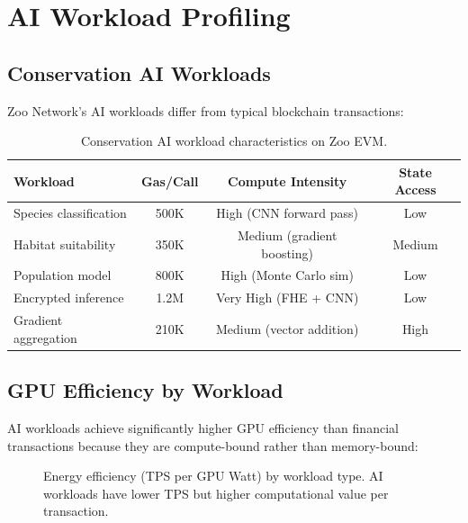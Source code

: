 \section{AI Workload Profiling}

\label{sec:ai-workloads}

\subsection{Conservation AI Workloads}

Zoo Network's AI workloads differ from typical blockchain transactions:

\begin{table}[t]
\centering
\begin{tabular}{lccc}
\toprule
\textbf{Workload} & \textbf{Gas/Call} & \textbf{Compute Intensity} & \textbf{State Access} \\
\midrule
Species classification & 500K & High (CNN forward pass) & Low \\
Habitat suitability & 350K & Medium (gradient boosting) & Medium \\
Population model & 800K & High (Monte Carlo sim) & Low \\
Encrypted inference & 1.2M & Very High (FHE + CNN) & Low \\
Gradient aggregation & 210K & Medium (vector addition) & High \\
\bottomrule
\end{tabular}
\caption{Conservation AI workload characteristics on Zoo EVM.}
\label{tab:ai-workloads}
\end{table}

\subsection{GPU Efficiency by Workload}

AI workloads achieve significantly higher GPU efficiency than financial transactions because they are compute-bound rather than memory-bound:

\begin{figure}[t]
\centering
{}
\caption{Energy efficiency (TPS per GPU Watt) by workload type. AI workloads have lower TPS but higher computational value per transaction.}
\label{fig:efficiency}
\end{figure}

